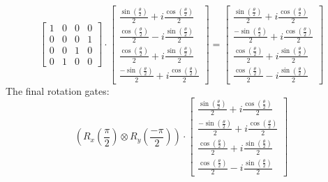 \documentclass{article}
\begin{document}
\[
	\begin{bmatrix}
		1 & 0 & 0 & 0 \\
		0 & 0 & 0 & 1 \\
		0 & 0 & 1 & 0 \\
		0 & 1 & 0 & 0
	\end{bmatrix}
	\cdot
	\begin{bmatrix}
		\frac{\sin \left(\frac{\theta}{2}\right)}{2} + i \frac{\cos \left(\frac{\theta}{2}\right)}{2} \\
		\frac{\cos \left(\frac{\theta}{2}\right)}{2} - i \frac{\sin \left(\frac{\theta}{2}\right)}{2} \\
		\frac{\cos \left(\frac{\theta}{2}\right)}{2} + i \frac{\sin \left(\frac{\theta}{2}\right)}{2} \\
		\frac{-\sin \left(\frac{\theta}{2}\right)}{2} + i \frac{\cos \left(\frac{\theta}{2}\right)}{2}
	\end{bmatrix}
	=
	\begin{bmatrix}
		\frac{\sin \left(\frac{\theta}{2}\right)}{2} + i \frac{\cos \left(\frac{\theta}{2}\right)}{2}  \\
		\frac{-\sin \left(\frac{\theta}{2}\right)}{2} + i \frac{\cos \left(\frac{\theta}{2}\right)}{2} \\
		\frac{\cos \left(\frac{\theta}{2}\right)}{2} + i \frac{\sin \left(\frac{\theta}{2}\right)}{2}  \\
		\frac{\cos \left(\frac{\theta}{2}\right)}{2} - i \frac{\sin \left(\frac{\theta}{2}\right)}{2}
	\end{bmatrix}
\]
The final rotation gates:
\[\left(R_x(\frac{\pi}{2}) \otimes R_y(\frac{-\pi}{2})\right) \cdot
	\begin{bmatrix}
		\frac{\sin \left(\frac{\theta}{2}\right)}{2} + i \frac{\cos \left(\frac{\theta}{2}\right)}{2}  \\
		\frac{-\sin \left(\frac{\theta}{2}\right)}{2} + i \frac{\cos \left(\frac{\theta}{2}\right)}{2} \\
		\frac{\cos \left(\frac{\theta}{2}\right)}{2} + i \frac{\sin \left(\frac{\theta}{2}\right)}{2}  \\
		\frac{\cos \left(\frac{\theta}{2}\right)}{2} - i \frac{\sin \left(\frac{\theta}{2}\right)}{2}
	\end{bmatrix}
\]
\end{document}
